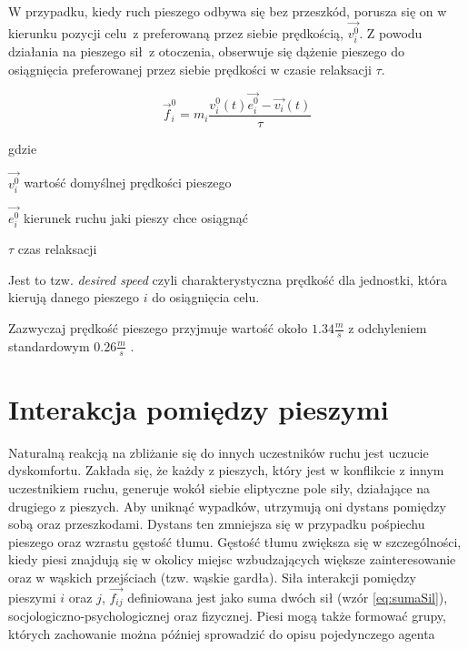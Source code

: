 W przypadku, kiedy ruch pieszego odbywa się bez przeszkód, porusza się on w kierunku pozycji celu~z preferowaną przez siebie prędkością, $\vec{v_{i}^{0}}$. Z powodu działania na pieszego sił~z otoczenia, obserwuje się dążenie pieszego do osiągnięcia preferowanej przez siebie prędkości w czasie relaksacji $\tau$.

\begin{equation}
\vec{f}_{i}^{0} = m_{i} \frac{v_{i}^{0}(t) \vec{e_{i}^{0}} - \vec{v_{i}}(t)}{\tau}
\end{equation}

gdzie
\begin{eqwhere}[2cm]
	\item[$\vec{v_{i}^{0}}$] wartość domyślnej prędkości pieszego
	\item[$\vec{e_{i}^{0}}$] kierunek ruchu jaki pieszy chce osiągnąć
	\item[$\tau$] czas relaksacji
\end{eqwhere}
	
Jest to tzw. \textit{desired speed} czyli charakterystyczna prędkość dla jednostki, która kierują danego pieszego $i$ do osiągnięcia celu.

Zazwyczaj prędkość pieszego przyjmuje wartość około $1.34 \frac{m}{s}$ \cite{transporttechnikDerFussganger} z odchyleniem standardowym $0.26 \frac{m}{s}$ \cite{HeBuAjTw}.

\section{Interakcja pomiędzy pieszymi}
\label{sec:interactionBetweenPedestrians}

Naturalną reakcją na zbliżanie się do innych uczestników ruchu jest uczucie dyskomfortu. Zakłada się, że każdy z pieszych, który jest w konflikcie z innym uczestnikiem ruchu, generuje wokół siebie eliptyczne pole siły, działające na drugiego z pieszych. Aby uniknąć wypadków, utrzymują oni dystans pomiędzy sobą oraz przeszkodami. Dystans ten zmniejsza się w przypadku pośpiechu pieszego oraz wzrastu gęstość tłumu. Gęstość tłumu zwiększa się w szczególności, kiedy piesi znajdują się w okolicy miejsc wzbudzających większe zainteresowanie oraz w wąskich przejściach (tzw. wąskie gardła). Siła interakcji pomiędzy pieszymi $i$ oraz $j$, $\vec{f_{ij}}$ definiowana jest jako suma dwóch sił (wzór \ref{eq:sumaSil}), socjologiczno-psychologicznej oraz fizycznej. Piesi mogą także formować grupy, których zachowanie można później sprowadzić do opisu pojedynczego agenta \cite{HeBuAjTw}

